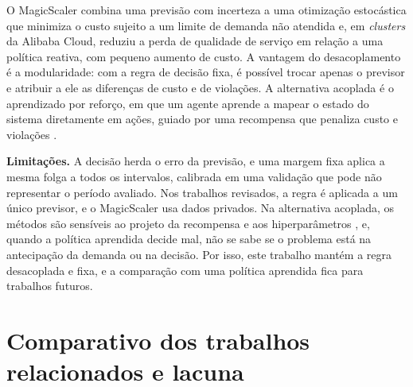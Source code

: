 O MagicScaler \cite{pan2023magicscaler} combina uma previsão com incerteza a uma otimização estocástica que minimiza o custo sujeito a um limite de demanda não atendida e, em \textit{clusters} da Alibaba Cloud, reduziu a perda de qualidade de serviço em relação a uma política reativa, com pequeno aumento de custo. A vantagem do desacoplamento é a modularidade: com a regra de decisão fixa, é possível trocar apenas o previsor e atribuir a ele as diferenças de custo e de violações. A alternativa acoplada é o aprendizado por reforço, em que um agente aprende a mapear o estado do sistema diretamente em ações, guiado por uma recompensa que penaliza custo e violações \cite{lorido2014autoscaling}.

\textbf{Limitações.} A decisão herda o erro da previsão, e uma margem fixa aplica a mesma folga a todos os intervalos, calibrada em uma validação que pode não representar o período avaliado. Nos trabalhos revisados, a regra é aplicada a um único previsor, e o MagicScaler usa dados privados. Na alternativa acoplada, os métodos são sensíveis ao projeto da recompensa e aos hiperparâmetros \cite{bodra2025ml}, e, quando a política aprendida decide mal, não se sabe se o problema está na antecipação da demanda ou na decisão. Por isso, este trabalho mantém a regra desacoplada e fixa, e a comparação com uma política aprendida fica para trabalhos futuros.

\section{Comparativo dos trabalhos relacionados e lacuna}
\label{sec:lacuna}


